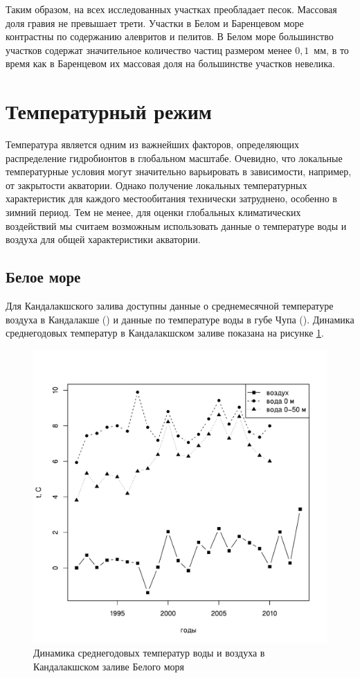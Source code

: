 \par\bigskip
Таким образом, на всех исследованных участках преобладает песок.
Массовая доля гравия не превышает трети.
Участки в Белом и Баренцевом море контрастны по содержанию алевритов и пелитов. 
В Белом море большинство участков содержат значительное количество частиц размером менее $0,1$~мм, в то время как в Баренцевом их массовая доля на большинстве участков невелика.

	\section{Температурный режим}
Температура является одним из важнейших факторов, определяющих распределение гидробионтов в глобальном масштабе.
Очевидно, что локальные температурные условия могут значительно варьировать в зависимости, например, от закрытости акватории.
Однако получение локальных температурных характеристик для каждого местообитания технически затруднено, особенно в зимний период.
Тем не менее, для оценки глобальных климатических воздействий мы считаем возможным использовать данные о температуре воды и воздуха для общей характеристики акватории.

		\subsection{Белое море}
Для Кандалакшского залива доступны данные о среднемесячной температуре воздуха в Кандалакше (\cite{KGZ_letopis, rp5_Kandalaksha}) и данные по температуре воды в губе Чупа (\cite{Berger_et_al_2003}).
Динамика среднегодовых температур в Кандалакшском заливе показана на рисунке \ref{ris:White_temp_year_dynamic}.
	\begin{figure}[p]
    \includegraphics[width=\textwidth]{../temperatures_water_air/White_temp_air_water_dynamic1.pdf}
    \caption{Динамика среднегодовых температур воды и воздуха в Кандалакшском заливе Белого моря}
    \label{ris:White_temp_year_dynamic}
	\end{figure}

